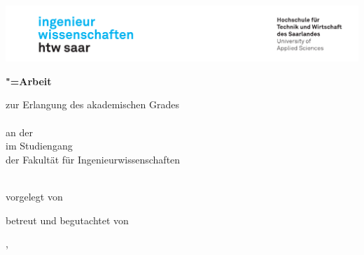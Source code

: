 \begin{titlepage}\linespread{1.5}\selectfont
\includegraphics[width=146mm]{Graphics/htwsaar_Logo_inwi_head_VF_4C_crop}
  \begin{center}
    \large  
    \vfill
    \begingroup
      \Large\bfseries\myDegreeType"=Arbeit 
    \endgroup
		
		\bigskip
		
    zur Erlangung des akademischen Grades \\
    \myDegree \\ 
    an der \myUni \\
    im Studiengang \myDegreeCourse \\
    der Fakultät für Ingenieurwissenschaften \\ 
    
  \vfill
	
  \begingroup
    \Large\bfseries\myTitle 
  \endgroup
	
	\bigskip
	
  vorgelegt von \\
  \myName
	
  \vfill
	
  betreut und begutachtet von \\
  \myFirstProf
	
  \vfill
	
  \myLocation, \myTime                   

    \end{center}       
\end{titlepage}   